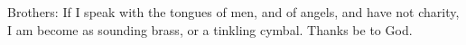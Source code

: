 Brothers: If I speak with the tongues of men, and of angels, and have not charity, I am become as sounding brass, or a tinkling cymbal. \rubric{\Rbar} Thanks be to God.